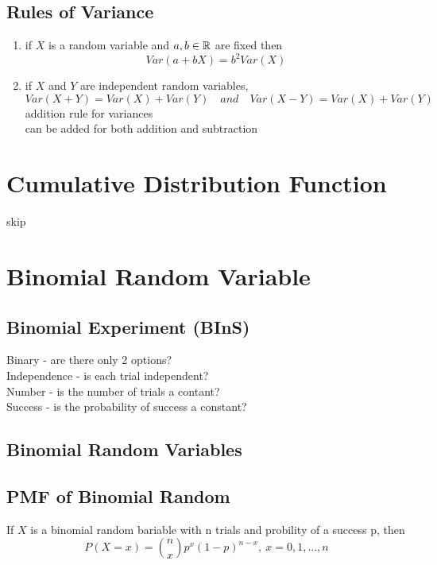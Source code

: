 \subsection{Rules of Variance}  %
\begin{enumerate}
    \item if $X$ is a random variable and $a, b\in\RR$ are fixed then
    \begin{equation}
        Var(a+bX)=b^2 Var(X)
    \end{equation}
    \item if $X$ and $Y$ are independent random variables,
    \begin{equation}
        Var(X+Y)=Var(X)+Var(Y)\quad and\quad Var(X-Y)=Var(X)+Var(Y)
    \end{equation}
    addition rule for variances \\
    can be added for both addition and subtraction \\
\end{enumerate}

\section{Cumulative Distribution Function}  %
skip

\section{Binomial Random Variable}  %
\subsection{Binomial Experiment (BInS)}  %
Binary - are there only 2 options? \\
Independence - is each trial independent? \\
Number - is the number of trials a contant? \\
Success - is the probability of success a constant?
\subsection{Binomial Random Variables}  %

\subsection{PMF of Binomial Random }  %
If $X$ is a binomial random bariable with n trials and probility of a success p, then
\begin{equation}
    P(X=x)=\binom{n}{x}p^x(1-p)^{n-x},\ x=0,1,\ldots, n
\end{equation}

